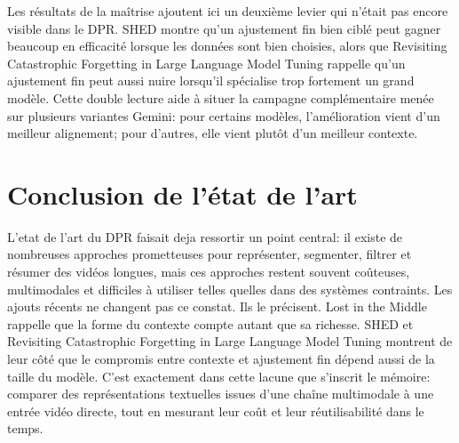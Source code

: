 Les résultats de la maîtrise ajoutent ici un deuxième levier qui n'était pas encore visible dans le DPR. SHED \cite{he2024_shed} montre qu'un ajustement fin bien ciblé peut gagner beaucoup en efficacité lorsque les données sont bien choisies, alors que Revisiting Catastrophic Forgetting in Large Language Model Tuning \cite{li2024_forgetting} rappelle qu'un ajustement fin peut aussi nuire lorsqu'il spécialise trop fortement un grand modèle. Cette double lecture aide à situer la campagne complémentaire menée sur plusieurs variantes Gemini: pour certains modèles, l'amélioration vient d'un meilleur alignement; pour d'autres, elle vient plutôt d'un meilleur contexte.

\section{Conclusion de l'état de l'art}

L'etat de l'art du DPR faisait deja ressortir un point central: il existe de nombreuses approches prometteuses pour représenter, segmenter, filtrer et résumer des vidéos longues, mais ces approches restent souvent coûteuses, multimodales et difficiles à utiliser telles quelles dans des systèmes contraints. Les ajouts récents ne changent pas ce constat. Ils le précisent. Lost in the Middle \cite{liu2024_lost} rappelle que la forme du contexte compte autant que sa richesse. SHED \cite{he2024_shed} et Revisiting Catastrophic Forgetting in Large Language Model Tuning \cite{li2024_forgetting} montrent de leur côté que le compromis entre contexte et ajustement fin dépend aussi de la taille du modèle. C'est exactement dans cette lacune que s'inscrit le mémoire: comparer des représentations textuelles issues d'une chaîne multimodale à une entrée vidéo directe, tout en mesurant leur coût et leur réutilisabilité dans le temps.
